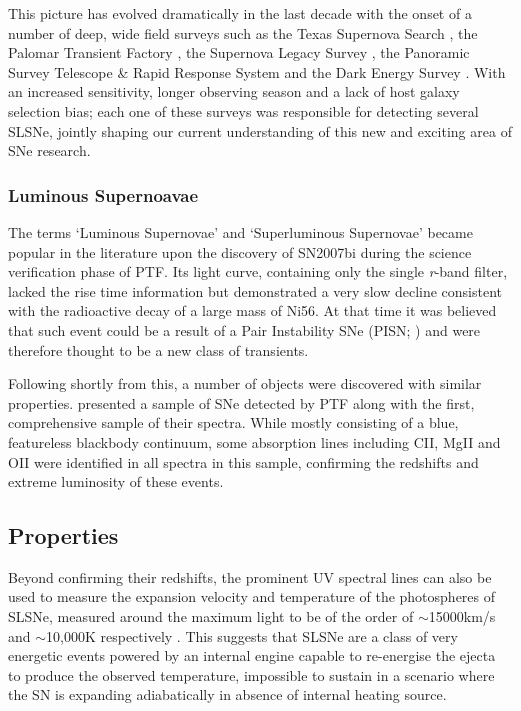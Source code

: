 This picture has evolved dramatically in the last decade with the onset of a number of deep, wide field surveys such as the Texas Supernova Search \citep[TSS;][]{Quimby2006}, the Palomar Transient Factory \citep[PTF;][]{Law2009, Rau2009}, the Supernova Legacy Survey \citep[SNLS;][]{Astier2005,Guy2010,Perrett2010}, the Panoramic Survey Telescope \& Rapid Response System \citep[Pan-STARRS;][]{Kaiser2010} and the Dark Energy Survey \citep[DES;][]{Flaugher2005}. With an increased sensitivity, longer observing season and a lack of host galaxy selection bias; each one of these surveys was responsible for detecting several SLSNe, jointly shaping our current understanding of this new and exciting area of SNe research.

\subsubsection{Luminous Supernoavae}
The terms `Luminous Supernovae' and `Superluminous Supernovae' became popular in the literature upon the discovery of SN2007bi \citep{Gal-Yam2009} during the science verification phase of PTF. Its light curve, containing only the single \textit{r}-band filter, lacked the rise time information but demonstrated a very slow decline consistent with the radioactive decay of a large mass of Ni56. At that time it was believed that such event could be a result of a Pair Instability SNe (PISN; ) and were therefore thought to be a new class of transients.

Following shortly from this, a number of objects were discovered with similar properties. \citet{Quimby2009} presented a sample of SNe detected by PTF along with the first, comprehensive sample of their spectra. While mostly consisting of a blue, featureless blackbody continuum, some absorption lines including CII, MgII and OII \citep[see ][for more recent line identification]{Mazzali2015a} were identified in all spectra in this sample, confirming the redshifts and extreme luminosity of these events.

\subsection{Properties}
Beyond confirming their redshifts, the prominent UV spectral lines can also be used to measure the expansion velocity and temperature of the photospheres of SLSNe, measured around the maximum light to be of the order of $\sim$15000km/s and $\sim$10,000K respectively \citep{Inserra2013}. This suggests that SLSNe are a class of very energetic events powered by an internal engine capable to re-energise the ejecta to produce the observed temperature, impossible to sustain in a scenario where the SN is expanding adiabatically in absence of internal heating source.

